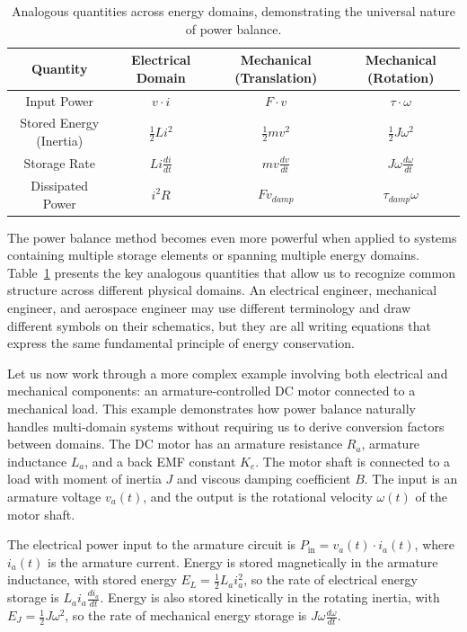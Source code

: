 \begin{table}[htbp]
\centering
\begin{tabular}{|c|c|c|c|}
\hline
\textbf{Quantity} & \textbf{Electrical Domain} & \textbf{Mechanical (Translation)} & \textbf{Mechanical (Rotation)} \\
\hline
Input Power & $v \cdot i$ & $F \cdot v$ & $\tau \cdot \omega$ \\
\hline
Stored Energy (Inertia) & $\frac{1}{2}Li^2$ & $\frac{1}{2}mv^2$ & $\frac{1}{2}J\omega^2$ \\
\hline
Storage Rate & $Li\frac{di}{dt}$ & $mv\frac{dv}{dt}$ & $J\omega\frac{d\omega}{dt}$ \\
\hline
Dissipated Power & $i^2R$ & $Fv_{damp}$ & $\tau_{damp}\omega$ \\
\hline
\end{tabular}
\caption{Analogous quantities across energy domains, demonstrating the universal nature of power balance.}
\label{tab:domain_analogies}
\end{table}

The power balance method becomes even more powerful when applied to systems containing multiple storage elements or spanning multiple energy domains. Table~\ref{tab:domain_analogies} presents the key analogous quantities that allow us to recognize common structure across different physical domains. An electrical engineer, mechanical engineer, and aerospace engineer may use different terminology and draw different symbols on their schematics, but they are all writing equations that express the same fundamental principle of energy conservation.

Let us now work through a more complex example involving both electrical and mechanical components: an armature-controlled DC motor connected to a mechanical load. This example demonstrates how power balance naturally handles multi-domain systems without requiring us to derive conversion factors between domains. The DC motor has an armature resistance $R_a$, armature inductance $L_a$, and a back EMF constant $K_e$. The motor shaft is connected to a load with moment of inertia $J$ and viscous damping coefficient $B$. The input is an armature voltage $v_a(t)$, and the output is the rotational velocity $\omega(t)$ of the motor shaft.

The electrical power input to the armature circuit is $P_{\text{in}} = v_a(t) \cdot i_a(t)$, where $i_a(t)$ is the armature current. Energy is stored magnetically in the armature inductance, with stored energy $E_L = \frac{1}{2}L_a i_a^2$, so the rate of electrical energy storage is $L_a i_a \frac{di_a}{dt}$. Energy is also stored kinetically in the rotating inertia, with $E_J = \frac{1}{2}J\omega^2$, so the rate of mechanical energy storage is $J\omega \frac{d\omega}{dt}$.

